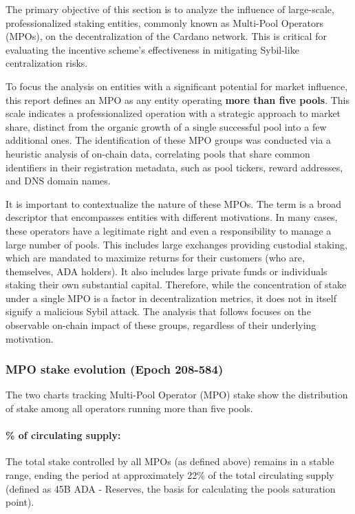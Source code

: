 \documentclass[11pt, letterpaper]{article}
\begin{document}
The primary objective of this section is to analyze the influence of large-scale,
professionalized staking entities, commonly known as Multi-Pool Operators (MPOs), on
the decentralization of the Cardano network. This is critical for evaluating the incentive
scheme's effectiveness in mitigating Sybil-like centralization risks.

To focus the analysis on entities with a significant potential for market influence,
this report defines an MPO as any entity operating \textbf{more than five pools}. This scale
indicates a professionalized operation with a strategic approach to market share, distinct from the
organic growth of a single successful pool into a few additional ones. The identification of these MPO
groups was conducted via a heuristic analysis of on-chain data, correlating pools that share
common identifiers in their registration metadata, such as pool tickers, reward addresses, and DNS domain names.

It is important to contextualize the nature of these MPOs. The term is a broad descriptor that
encompasses entities with different motivations. In many cases, these operators have a legitimate
right and even a responsibility to manage a large number of pools. This includes large exchanges providing
custodial staking, which are mandated to maximize returns for their customers (who are, themselves, ADA holders).
It also includes large private funds or individuals staking their own substantial capital. Therefore,
while the concentration of stake under a single MPO is a factor in decentralization metrics, it does not
in itself signify a malicious Sybil attack. The analysis that follows focuses on the observable
on-chain impact of these groups, regardless of their underlying motivation.

\newpage
\subsubsection{MPO stake evolution (Epoch 208-584)}

The two charts tracking Multi-Pool Operator (MPO) stake show the distribution
of stake among all operators running more than five pools.

\paragraph{\% of circulating supply:} The total stake controlled by all MPOs (as defined above)
remains in a stable range, ending the period at approximately 22\% of the total circulating
supply (defined as 45B ADA - Reserves, the basis for calculating the pools saturation point).
\end{document}
